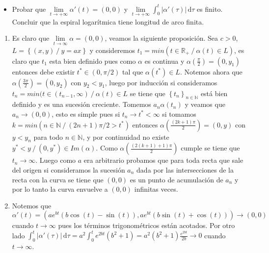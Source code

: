 \documentclass[11pt]{article}
\newcommand{\R}{{\mathbb{R}}}
\newcommand{\N}{{\mathbb{N}}}
\newcommand\dd{\,\mathrm{d}}
\newcommand\abs[1]{\left\lvert#1\right\rvert}
\newcommand{\sett}[1]{\left\lbrace#1\right\rbrace}
\newenvironment{proof}[1][Demostraci\'on]{\begin{trivlist}
		\item[\hskip \labelsep {\bfseries #1}]}{\end{trivlist}}
\newcommand{\qed}{\nobreak \ifvmode \relax \else
	\ifdim\lastskip<1.5em \hskip-\lastskip
	\hskip1.5em plus0em minus0.5em \fi \nobreak
	\vrule height0.75em width0.5em depth0.25em\fi}
\begin{document}
\begin{enumerate}
\begin{itemize}
		\item Probar que $\lim\limits_{t\to +\infty }\alpha'(t)=(0,0)$ y $\lim\limits_{t\to +\infty
		}\int_0^t\abs{\alpha'(\tau)}\dd \tau$ es finito. Concluir que la espiral logar\'itmica tiene
		longitud de arco finita.
	\end{itemize}
	
	\label{Ejecicio 4}
	
	\begin{proof}
		\begin{enumerate}
			
			\item Es claro que $\lim\limits_{t \rightarrow \infty} \alpha = (0,0)$, veamos la siguiente proposici\'on. Sea $c > 0$, $L = \sett{(x,y) \ / \ y = ax}$ y consideremos $t_1 = min (t \in \R_{+} \ / \ \alpha(t) \in L)$, es claro que $t_1$ esta bien definido pues como $\alpha$ es continua y $\alpha ( \frac{\pi}{2}) = (0,y_1)$ entonces debe existir $t^* \in (0, \pi/2)$ tal que $\alpha(t^*) \in L$. Notemos ahora que $\alpha(\frac{3 \pi}{2}) = (0,y_2)$ con $y_2 < y_1$, luego por inducci\'on si consideramos $t_n = min (t \in (t_{n-1}, \infty) \ / \ \alpha(t) \in L$ se tiene que $\sett{t_n}_{n \in \N}$ est\'a bien definido y es una sucesi\'on creciente.	Tomemos $a_n \alpha(t_n) $ y veamos que $a_n \rightarrow (0,0)$, esto es simple pues si $t_n \rightarrow t^* < \infty$ si tomamos $k = min (n \in \N \ / \ (2n+1)\pi / 2 > t^* )$ entonces $\alpha(\frac{(2k+1)\pi}{2}) = (0,y)$ con $y < y_n$ para todo $n \in \N$, y por continuidad no existe $y^* < y \ / \ (0,y^*) \in Im(\alpha)$. Como $\alpha(\frac{(2(k+1)+1)\pi}{2})$ cumple se tiene que $t_n \rightarrow \infty$.  Luego como $a$ era arbitrario probamos que para toda recta que sale del origen si consideramos la sucesi\'on $a_n$ dada por las intersecciones de la recta con la curva se tiene que $(0,0)$ es un punto de acumulaci\'on de $a_n$ y por lo tanto la curva envuelve a $(0,0)$ infinitas veces.
			
			\item Notemos que $\alpha\prime (t) = \left( ae^{bt}(b\cos(t) - \sin(t)) , ae^{bt}(b\sin(t) + \cos(t))   \right) \rightarrow (0,0)$ cuando $t \rightarrow \infty$ pues los t\'erminos trigonom\'etricos est\'an acotados. Por otro lado $\int_0^t\abs{\alpha'(\tau)}\dd \tau = a^2 \int_{0}^{t} {e^{2bt}(b^2 + 1)} = a^2(b^2+1) \frac{e^{2bt}}{2b} \rightarrow 0$ cuando $t \rightarrow \infty$. \qed 
			
			
		\end{enumerate}
	\end{proof}
	

\end{enumerate}
\end{document}
